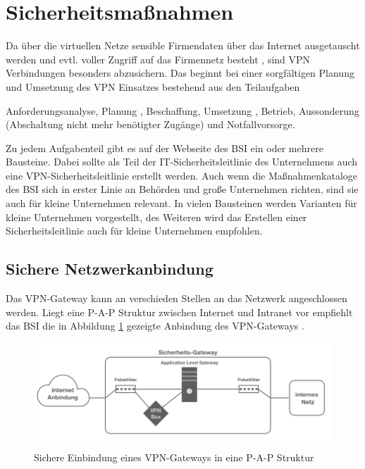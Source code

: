 \section{Sicherheitsmaßnahmen}
Da über die virtuellen Netze sensible Firmendaten über das Internet ausgetauscht werden und evtl. voller Zugriff auf das Firmennetz besteht \cite{singh2012enhancing}, sind VPN Verbindungen besonders abzusichern. Das beginnt bei einer sorgfältigen Planung und Umsetzung des VPN Einsatzes bestehend aus den Teilaufgaben \cite{bsivpn} 

	 Anforderungsanalyse,
 Planung ,
	 Beschaffung,
	 Umsetzung ,
 Betrieb,
	 Aussonderung (Abschaltung nicht mehr benötigter Zugänge) und
	Notfallvorsorge.

Zu jedem Aufgabenteil gibt es auf der Webseite des BSI ein oder mehrere Bausteine. 
Dabei sollte als Teil der IT-Sicherheitsleitlinie des Unternehmens auch eine VPN-Sicherheitsleitlinie erstellt werden. 
Auch wenn die Maßnahmenkataloge des BSI sich in erster Linie an Behörden und große Unternehmen richten, sind sie auch für kleine Unternehmen relevant. In vielen Bausteinen werden Varianten für kleine Unternehmen vorgestellt, des Weiteren wird das Erstellen einer Sicherheitsleitlinie auch für kleine Unternehmen empfohlen. 





\subsection{Sichere Netzwerkanbindung}
Das VPN-Gateway kann an verschieden Stellen an das Netzwerk angeschlossen werden. Liegt eine P-A-P Struktur zwischen Internet und Intranet vor empfiehlt das BSI die in Abbildung \ref{vpnarch} gezeigte Anbindung des VPN-Gateways \cite{isi-lana}. 

\begin{figure}[h]
	\includegraphics[width=\linewidth]{vpnarchitektur.jpeg}
	\caption{Sichere Einbindung eines VPN-Gateways in eine P-A-P Struktur}
	\label{vpnarch}
\end{figure}

